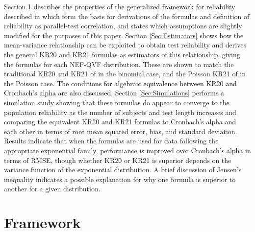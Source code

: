 \documentclass[12pt,epsfig]{article}
\newcommand{\changed}[1]{\textcolor{black}{#1}}
\begin{document}
Section \ref{Sec:Framework} describes the properties of the generalized framework for reliability described in \cite{Foster2020} which form the basis for derivations of the formulas and definition of reliability as parallel-test correlation, and states which assumptions are slightly modified for the purposes of this paper. Section \ref{Sec:Estimators} shows how the mean-variance relationship can be exploited to obtain test reliability and derives the general KR20 and KR21 formulas as estimators of this relationship, giving the formulas for each NEF-QVF distribution. These are shown to match the traditional KR20 and KR21 of \cite{Kuder1937} in the binomial case, and the Poisson KR21 of \cite{Allison1978} in the Poisson case. \changed{The conditions for algebraic equivalence between KR20 and Cronbach's alpha are also discussed.}  Section \ref{Sec:Simulations} performs a simulation study showing that these formulas do appear to converge to the population reliability as the number of subjects and test length increases and comparing the equivalent KR20 and KR21 formulas to Cronbach's alpha and each other in terms of root mean squared error, bias, and standard deviation. Results indicate that when the formulas are used for data following the appropriate exponential family, performance is improved over Cronbach's alpha in terms of RMSE, though whether KR20 or KR21 is superior depends on the variance function of the exponential distribution. A brief discussion of Jensen's inequality indicates a possible explanation for why one formula is superior to another for a given distribution.






\section{Framework}
\label{Sec:Framework}
\end{document}

